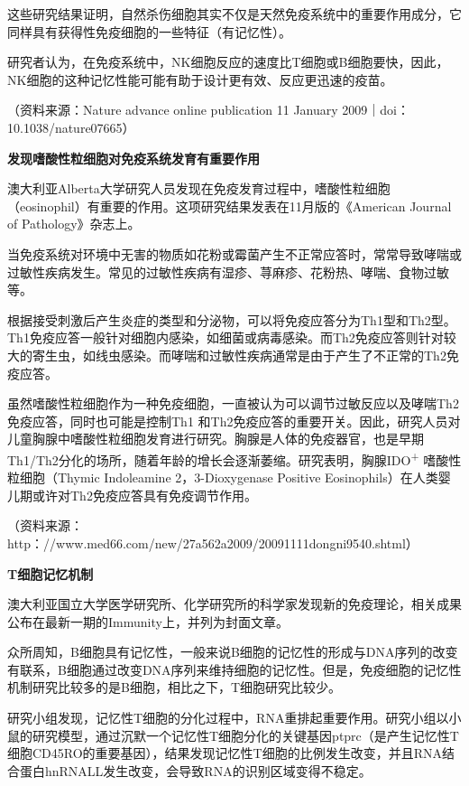 这些研究结果证明，自然杀伤细胞其实不仅是天然免疫系统中的重要作用成分，它同样具有获得性免疫细胞的一些特征（有记忆性）。

研究者认为，在免疫系统中，NK细胞反应的速度比T细胞或B细胞要快，因此，NK细胞的这种记忆性能可能有助于设计更有效、反应更迅速的疫苗。

（资料来源：Nature advance online publication 11 January
2009｜doi：10.1038/nature07665）

\begin{center}
\textbf{\Large 发现嗜酸性粒细胞对免疫系统发育有重要作用}
\end{center}

澳大利亚Alberta大学研究人员发现在免疫发育过程中，嗜酸性粒细胞（eosinophil）有重要的作用。这项研究结果发表在11月版的《American
Journal of Pathology》杂志上。

当免疫系统对环境中无害的物质如花粉或霉菌产生不正常应答时，常常导致哮喘或过敏性疾病发生。常见的过敏性疾病有湿疹、荨麻疹、花粉热、哮喘、食物过敏等。

根据接受刺激后产生炎症的类型和分泌物，可以将免疫应答分为Th1型和Th2型。Th1免疫应答一般针对细胞内感染，如细菌或病毒感染。而Th2免疫应答则针对较大的寄生虫，如线虫感染。而哮喘和过敏性疾病通常是由于产生了不正常的Th2免疫应答。

虽然嗜酸性粒细胞作为一种免疫细胞，一直被认为可以调节过敏反应以及哮喘Th2免疫应答，同时也可能是控制Th1
和Th2免疫应答的重要开关。因此，研究人员对儿童胸腺中嗜酸性粒细胞发育进行研究。胸腺是人体的免疫器官，也是早期Th1/Th2分化的场所，随着年龄的增长会逐渐萎缩。研究表明，胸腺IDO\textsuperscript{+}
嗜酸性粒细胞（Thymic Indoleamine 2，3-Dioxygenase Positive
Eosinophils）在人类婴儿期或许对Th2免疫应答具有免疫调节作用。

（资料来源：http：//www.med66.com/new/27a562a2009/20091111dongni9540.shtml）

\begin{center}
\textbf{\Large T细胞记忆机制}
\end{center}

澳大利亚国立大学医学研究所、化学研究所的科学家发现新的免疫理论，相关成果公布在最新一期的Immunity上，并列为封面文章。

众所周知，B细胞具有记忆性，一般来说B细胞的记忆性的形成与DNA序列的改变有联系，B细胞通过改变DNA序列来维持细胞的记忆性。但是，免疫细胞的记忆性机制研究比较多的是B细胞，相比之下，T细胞研究比较少。

研究小组发现，记忆性T细胞的分化过程中，RNA重排起重要作用。研究小组以小鼠的研究模型，通过沉默一个记忆性T细胞分化的关键基因ptprc（是产生记忆性T细胞CD45RO的重要基因），结果发现记忆性T细胞的比例发生改变，并且RNA结合蛋白hnRNALL发生改变，会导致RNA的识别区域变得不稳定。

